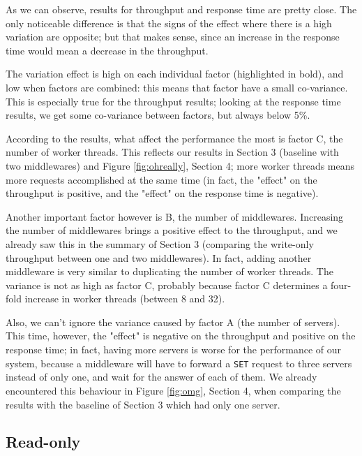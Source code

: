 \documentclass[11pt,a4paper]{article}
\renewcommand{\t}[1]{%
	{\texttt{#1}}}
\begin{document}
As we can observe, results for throughput and response time are pretty close. The only noticeable difference
is that the signs of the effect where there is a high variation are opposite; but that makes sense, since an increase
in the response time would mean a decrease in the throughput.

The variation effect is high on each individual factor (highlighted in bold), and low when factors
are combined: this means that factor have a small co-variance. This is especially true for the throughput results; looking
at the response time results, we get some co-variance between factors, but always below 5\%. 

According to the results, what affect the performance the most is factor C, the number of worker threads. This reflects
our results in Section 3 (baseline with two middlewares) and Figure \ref{fig:ohreally}, Section 4; more worker threads means more requests
accomplished at the same time (in fact, the "effect" on the throughput is positive, and the "effect" on the response time 
is negative).

Another important factor however is B, the number of middlewares. Increasing the number of middlewares brings a positive 
effect to the throughput, and we already saw this in the summary of Section 3 (comparing the write-only throughput between one and two
middlewares). In fact, adding another middleware is very similar to duplicating the number of worker threads. The
variance is not as high as factor C, probably because factor C determines a four-fold increase in worker threads (between
8 and 32).

Also, we can't ignore the variance caused by factor A (the number of servers). This time, however, the "effect" is negative
on the throughput and positive on the response time; in fact, having more servers is worse for the performance of our
system, because a middleware will have to forward a \t{SET} request to three servers instead of only one, and wait
for the answer of each of them. We already encountered this behaviour in Figure \ref{fig:omg}, Section 4, when comparing
the results with the baseline of Section 3 which had only one server.




\subsection{Read-only}
\end{document}

